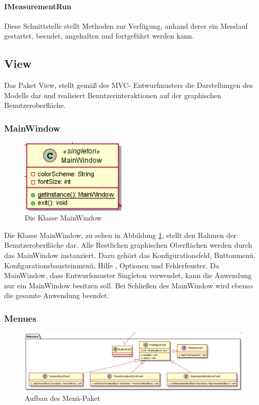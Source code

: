 \documentclass[parskip=full]{scrartcl}
\begin{document}
\paragraph{IMeasurementRun}

Diese Schnittstelle stellt Methoden zur Verfügung, anhand derer ein Messlauf gestartet, beendet, angehalten und fortgeführt werden kann.

\clearpage
\subsection{View}
Das Paket View, stellt gemäß des MVC- Entwurfmusters die Darstellungen des Modells dar und realisiert Benutzerinteraktionen auf der graphischen Benutzeroberfläche. 

\subsubsection{MainWindow} 

\begin{figure}[htbp]
	\begin{center}
		\includegraphics[width = 5cm]{Grafiken/View/MainWindow.png}
		\caption{Die Klasse MainWindow}
		\label{MainWindow}
	\end{center}
\end{figure}

Die Klasse MainWindow, zu sehen in Abbildung \ref{MainWindow}, stellt den Rahmen der Benutzeroberfläche dar. Alle Restlichen graphischen Oberflächen werden durch das MainWindow instanziert. Dazu gehört das Konfigurationsfeld, Buttonmenü, Konfigurationsbausteinmenü, Hilfe , Optionen und Fehlerfenster. 
Da MainWindow, dass Entwurfsmuster Singleton verwendet, kann die Anwendung nur ein MainWindow besitzen soll.
Bei Schließen des MainWindow wird ebenso die gesamte Anwendung beendet.

\newpage

\subsubsection{Menues}

\begin{figure}[htbp]
	\begin{center}
		\includegraphics[width = 14cm]{Grafiken/View/MenuesNamespace.png}
		\caption{Aufbau des Menü-Paket}
		\label{Menues}
	\end{center}
\end{figure}
\end{document}
